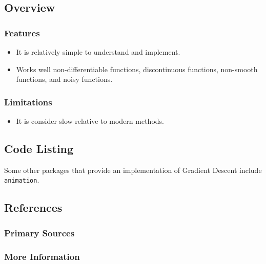 \subsection{Overview}

\subsubsection{Features}

\begin{itemize}
	\item It is relatively simple to understand and implement.
	\item Works well non-differentiable functions, discontinuous functions, non-smooth functions, and noisy functions.
\end{itemize}

\subsubsection{Limitations}

\begin{itemize}
	\item It is consider slow relative to modern methods.
\end{itemize}

\subsection{Code Listing}

Some other packages that provide an implementation of Gradient Descent include \texttt{animation}.




\subsection{References}

\subsubsection{Primary Sources}


\subsubsection{More Information}




